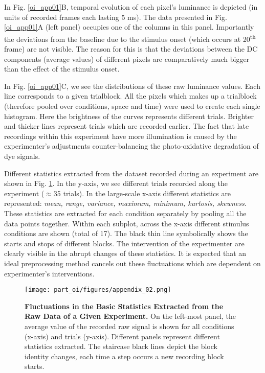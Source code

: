In Fig. \ref{oi_app01}B, temporal evolution of each pixel's luminance is
depicted (in units of recorded frames each lasting 5 ms). The data
presented in Fig. \ref{oi_app01}A (left panel) occupies one of the columns
in this panel. Importantly the deviations from the baseline due to the
stimulus onset (which occurs at 20\textsuperscript{th} frame) are not
visible. The reason for this is that the deviations between the DC
components (average values) of different pixels are comparatively much
bigger than the effect of the stimulus onset.
 
In Fig. \ref{oi_app01}C, we see the distributions of these raw luminance
values. Each line corresponds to a given trialblock. All the pixels which
makes up a trialblock (therefore pooled over conditions, space and time)
were used to create each single histogram. Here the brightness of the
curves represents different trials. Brighter and thicker lines represent
trials which are recorded earlier. The fact that late recordings within
this experiment have more illumination is caused by the experimenter's
adjustments counter-balancing the photo-oxidative degradation of dye
signals. 


Different statistics extracted from the dataset recorded during an
experiment are shown in Fig. \ref{raw_ss}. In the y-axis, we see different
trials recorded along the experiment ($\approx$35 trials). In the
large-scale x-axis different statistics are represented: \textit{mean,
range, variance, maximum, minimum, kurtosis, skewness}. These statistics
are extracted for each condition separately by pooling all the data points
together. Within each subplot, across the x-axis different stimulus
conditions are shown (total of 17). The black thin line symbolically shows
the starts and stops of different blocks. The intervention of the
experimenter are clearly visible in the abrupt changes of these statistics.
It is expected that an ideal preprocessing method cancels out these
fluctuations which are dependent on experimenter's interventions. 

\begin{figure}
\centerline{
\texttt{[image: part\_oi/figures/appendix\_02.png]}}
\caption[Fluctuations in the Basic Statistics Extracted from the Raw Data
of a Given Experiment.]{\textbf{Fluctuations in the Basic Statistics
Extracted from the Raw Data of a Given Experiment.} On the left-most panel,
the average value of the recorded raw signal is shown for all conditions
(x-axis) and trials (y-axis). Different panels represent different
statistics extracted. The staircase black lines depict the block identity
changes, each time a step occurs a new recording block starts.}
\label{raw_ss} 
\end{figure}


